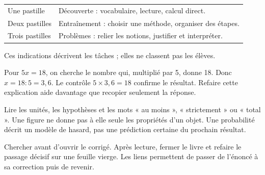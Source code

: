 \clearpage\thispagestyle{otFront}\label{mode-emploi}\fontsize{11}{15}\selectfont

\begin{tabularx}{\linewidth}{@{}lY@{}}\toprule
Une pastille & Découverte : vocabulaire, lecture, calcul direct.\\[3mm]
Deux pastilles & Entraînement : choisir une méthode, organiser des étapes.\\[3mm]
Trois pastilles & Problèmes : relier les notions, justifier et interpréter.\\\bottomrule
\end{tabularx}\par\medskip
Ces indications décrivent les tâches ; elles ne classent pas les élèves.\par\medskip
\begin{exemple}Pour $5x=18$, on cherche le nombre
qui, multiplié par 5, donne 18. Donc $x=18:5=3{,}6$.
Le contrôle $5\times3{,}6=18$ confirme le résultat.
Refaire cette explication aide davantage que recopier seulement la réponse.\end{exemple}
\begin{attention}Lire les unités, les hypothèses et les mots « au moins »,
« strictement » ou « total ». Une figure ne donne pas à elle seule les
propriétés d’un objet. Une probabilité décrit un modèle de hasard,
pas une prédiction certaine du prochain résultat.\end{attention}
Chercher avant d’ouvrir le corrigé. Après lecture, fermer le livre et refaire
le passage décisif sur une feuille vierge. Les liens permettent de passer
de l’énoncé à sa correction puis de revenir.

\clearpage
